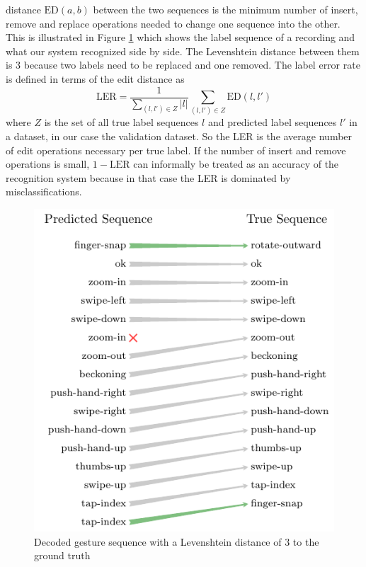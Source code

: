 \noindent
distance $\mathrm{ED}(a, b)$ between the two sequences is the minimum number of
insert, remove and replace operations needed to change one sequence into the
other. This is illustrated in Figure \ref{fig:levenshtein} which shows the label
sequence of a recording and what our system recognized side by side. The
Levenshtein distance between them is 3 because two labels need to be replaced
and one removed. The label error rate is defined in terms of the edit distance
as
\begin{equation*}
  \mathrm{LER} = \frac{1}{\sum_{(l, l') \in Z} |l|} \sum_{(l, l') \in Z} \mathrm{ED}(l, l')
\end{equation*}
where $Z$ is the set of all true label sequences $l$ and predicted label
sequences $l'$ in a dataset, in our case the validation dataset. So the LER is
the average number of edit operations necessary per true label. If the number of
insert and remove operations is small, $1 - \mathrm{LER}$ can informally be
treated as an accuracy of the recognition system because in that case the LER is
dominated by misclassifications.

\begin{figure}[h]
  \centering
  \includegraphics{figures/results/levenshtein}
  \caption{Decoded gesture sequence with a Levenshtein distance of 3 to the
    ground truth}
  \label{fig:levenshtein}
\end{figure}

